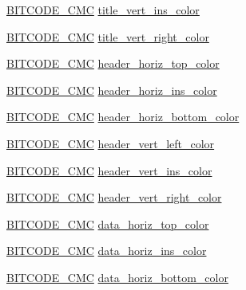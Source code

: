 \begin{DoxyCompactItemize}
\item 
\hyperlink{dwg_8h_add86ce54dd5e62c8f7f5a870b467919a}{\-B\-I\-T\-C\-O\-D\-E\-\_\-\-C\-M\-C} \hyperlink{struct__dwg__entity__TABLE_a4ca2b88d5d4c91fd0177ecd1bb8bd2ff}{title\-\_\-vert\-\_\-ins\-\_\-color}
\item 
\hyperlink{dwg_8h_add86ce54dd5e62c8f7f5a870b467919a}{\-B\-I\-T\-C\-O\-D\-E\-\_\-\-C\-M\-C} \hyperlink{struct__dwg__entity__TABLE_a84b50e27513f104900a1f516e26e1d51}{title\-\_\-vert\-\_\-right\-\_\-color}
\item 
\hyperlink{dwg_8h_add86ce54dd5e62c8f7f5a870b467919a}{\-B\-I\-T\-C\-O\-D\-E\-\_\-\-C\-M\-C} \hyperlink{struct__dwg__entity__TABLE_a7c2a2a54aa85897c87da65942ac4bb7b}{header\-\_\-horiz\-\_\-top\-\_\-color}
\item 
\hyperlink{dwg_8h_add86ce54dd5e62c8f7f5a870b467919a}{\-B\-I\-T\-C\-O\-D\-E\-\_\-\-C\-M\-C} \hyperlink{struct__dwg__entity__TABLE_a824e4a15b74ca9eb4cf4ebfaf6f3687c}{header\-\_\-horiz\-\_\-ins\-\_\-color}
\item 
\hyperlink{dwg_8h_add86ce54dd5e62c8f7f5a870b467919a}{\-B\-I\-T\-C\-O\-D\-E\-\_\-\-C\-M\-C} \hyperlink{struct__dwg__entity__TABLE_afeb836b764308b2815018fb6b4ab3ddd}{header\-\_\-horiz\-\_\-bottom\-\_\-color}
\item 
\hyperlink{dwg_8h_add86ce54dd5e62c8f7f5a870b467919a}{\-B\-I\-T\-C\-O\-D\-E\-\_\-\-C\-M\-C} \hyperlink{struct__dwg__entity__TABLE_a91ecb79ce6858fbcb65be2c6d9e535e3}{header\-\_\-vert\-\_\-left\-\_\-color}
\item 
\hyperlink{dwg_8h_add86ce54dd5e62c8f7f5a870b467919a}{\-B\-I\-T\-C\-O\-D\-E\-\_\-\-C\-M\-C} \hyperlink{struct__dwg__entity__TABLE_abbc3852fe63ed11de0ad51a00e78db36}{header\-\_\-vert\-\_\-ins\-\_\-color}
\item 
\hyperlink{dwg_8h_add86ce54dd5e62c8f7f5a870b467919a}{\-B\-I\-T\-C\-O\-D\-E\-\_\-\-C\-M\-C} \hyperlink{struct__dwg__entity__TABLE_a0ee147c1430e0cce19bb002aa4041d4f}{header\-\_\-vert\-\_\-right\-\_\-color}
\item 
\hyperlink{dwg_8h_add86ce54dd5e62c8f7f5a870b467919a}{\-B\-I\-T\-C\-O\-D\-E\-\_\-\-C\-M\-C} \hyperlink{struct__dwg__entity__TABLE_a8b912fe1231d9ac2ba9e3c8a6539a952}{data\-\_\-horiz\-\_\-top\-\_\-color}
\item 
\hyperlink{dwg_8h_add86ce54dd5e62c8f7f5a870b467919a}{\-B\-I\-T\-C\-O\-D\-E\-\_\-\-C\-M\-C} \hyperlink{struct__dwg__entity__TABLE_abfcb8cbef7d89505683362a74d9fbfe0}{data\-\_\-horiz\-\_\-ins\-\_\-color}
\item 
\hyperlink{dwg_8h_add86ce54dd5e62c8f7f5a870b467919a}{\-B\-I\-T\-C\-O\-D\-E\-\_\-\-C\-M\-C} \hyperlink{struct__dwg__entity__TABLE_a81d5f4cd1020f7fb8dc294a4f6771ea8}{data\-\_\-horiz\-\_\-bottom\-\_\-color}

\end{DoxyCompactItemize}
